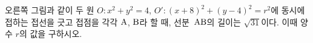 \noindent\begin{minipage}[t]{0.58\linewidth}\vspace{0pt}\raggedright 오른쪽 그림과 같이 두 원 $O:x^2+y^2=4$, $O':(x+8)^2+(y-4)^2=r^2$에 동시에 접하는 접선을 긋고 접점을 각각 $\mathrm{A}$, $\mathrm{B}$라 할 때, 선분~$\mathrm{AB}$의 길이는 $\sqrt{31}$이다. 이때 양수 $r$의 값을 구하시오.\end{minipage}\hfill\begin{minipage}[t]{0.4\linewidth}\vspace{0pt}\centering \resizebox{\ifdim\width>\linewidth\linewidth\else\width\fi}{!}{}\end{minipage}\par
